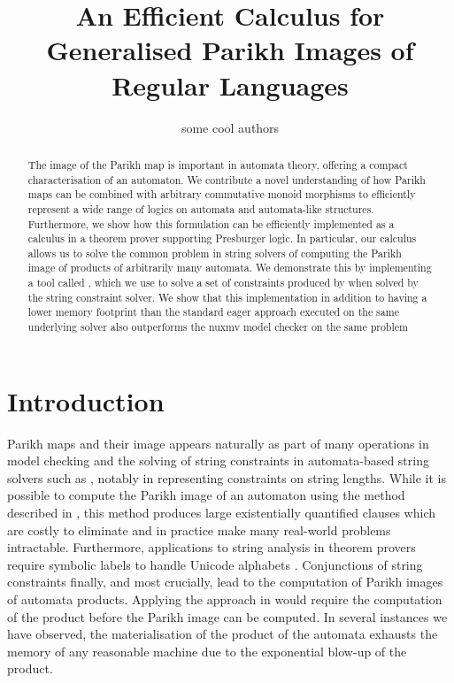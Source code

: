 \documentclass{easychair}
\title{An Efficient Calculus for Generalised Parikh Images of Regular Languages}
\author{some cool authors}
\institute{Uppsala University, Sweden}
\theoremstyle{definition}
\begin{document}
\maketitle

\begin{abstract}
  The image of the Parikh map is important in automata theory, offering a
  compact characterisation of an automaton. We contribute a novel understanding
  of how Parikh maps can be combined with arbitrary commutative monoid morphisms
  to efficiently represent a wide range of logics on automata and automata-like
  structures. Furthermore, we show how this formulation can be efficiently
  implemented as a calculus in a theorem prover supporting Presburger logic. In
  particular, our calculus allows us to solve the common problem in string
  solvers of computing the Parikh image of products of arbitrarily many
  automata. We demonstrate this by implementing a tool called \Catra{}, which we
  use to solve a set of constraints produced by  when
  solved by the \Ostrich{} string constraint solver. We show that this
  implementation in addition to having a lower memory footprint than the
  standard eager approach executed on the same underlying solver also
  outperforms the nuxmv model checker on the same problem
\end{abstract}

\section{Introduction}

Parikh maps and their image appears naturally as part of many operations in model checking and the solving of string constraints in automata-based string solvers such as \Ostrich{}, notably in representing constraints on string lengths. While it is possible to compute the Parikh image of an automaton using the method described in \cite{generate-parikh-image}, this method produces large existentially quantified clauses which are costly to eliminate and in practice make many real-world problems intractable. Furthermore, applications to string analysis in theorem provers require symbolic labels to handle Unicode alphabets . Conjunctions of string constraints finally, and most crucially, lead to the computation of Parikh images of automata products. Applying the approach in \cite{generate-parikh-image} would require the computation of the product before the Parikh image can be computed. In several instances we have observed, the materialisation of the product of the automata exhausts the memory of any reasonable machine due to the exponential blow-up of the product.
\end{document}
